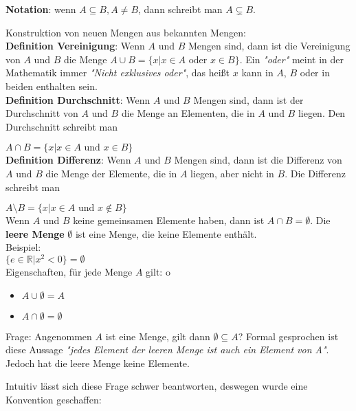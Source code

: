 \documentclass{article}
\begin{document}
\textbf{Notation}: wenn $A \subseteq B, A \ne B$, dann schreibt man $A \subsetneq B$.

Konstruktion von neuen Mengen aus bekannten Mengen: \\

\textbf{Definition Vereinigung}: Wenn $A$ und $B$ Mengen sind, dann ist die Vereinigung von $A$ und $B$ die
Menge $A \cup B = \{ x | x \in A \text{ oder } x \in B \}$. Ein \emph{"oder"} meint in der Mathematik immer
\emph{"Nicht exklusives oder"}, das heißt $x$ kann in $A$, $B$ oder in beiden enthalten sein. \\

\textbf{Definition Durchschnitt}: Wenn $A$ und $B$ Mengen sind, dann ist der Durchschnitt von $A$ und $B$ die
Menge an Elementen, die in $A$ und $B$ liegen. Den Durchschnitt schreibt man

$A \cap B = \{ x | x \in A \text{ und } x \in B\}$ \\

\textbf{Definition Differenz}: Wenn $A$ und $B$ Mengen sind, dann ist die Differenz von $A$ und $B$ die
Menge der Elemente, die in $A$ liegen, aber nicht in $B$. Die Differenz schreibt man

$A \setminus B = \{ x | x \in A \text{ und } x \notin B\}$ \\

Wenn $A$ und $B$ keine gemeinsamen Elemente haben, dann ist $A \cap B = \emptyset$.
Die \textbf{leere Menge} $\emptyset$ ist eine Menge, die keine Elemente enthält. \\

Beispiel: \\
$\{e \in \mathbb{R} | x^2 < 0\} = \emptyset$ \\

Eigenschaften, für jede Menge $A$ gilt:
o\begin{itemize}
\item $A \cup \emptyset = A$
\item $A \cap \emptyset = \emptyset$
\end{itemize}

Frage: Angenommen $A$ ist eine Menge, gilt dann $\emptyset \subseteq A$?
Formal gesprochen ist diese Aussage \emph{"jedes Element der leeren Menge ist auch ein Element von A"}.
Jedoch hat die leere Menge keine Elemente.

Intuitiv lässt sich diese Frage schwer beantworten, deswegen wurde eine Konvention geschaffen: \\
\end{document}
